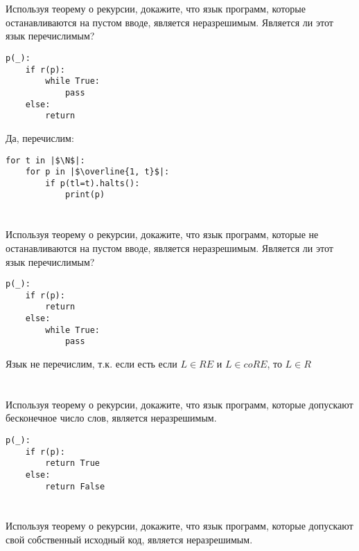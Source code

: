 



\setcounter{section}{167}

\section{}
Используя теорему о рекурсии, докажите, что язык программ, которые останавливаются на пустом вводе, является неразрешимым. Является ли этот язык перечислимым?

\begin{verbatim}
p(_):
    if r(p):
        while True:
            pass
    else:
        return
\end{verbatim}

Да, перечислим:
\begin{verbatim}
for t in |$\N$|:
    for p in |$\overline{1, t}$|:
        if p(tl=t).halts():
            print(p)
\end{verbatim}

\section{}
Используя теорему о рекурсии, докажите, что язык программ, которые не останавливаются на пустом вводе, является неразрешимым. Является ли этот язык перечислимым?

\begin{verbatim}
p(_):
    if r(p):
        return
    else:
        while True:
            pass
\end{verbatim}

Язык не перечислим, т.к. если есть если \(L \in RE\) и \(L \in coRE\), то \(L \in R\)

\section{}
Используя теорему о рекурсии, докажите, что язык программ, которые допускают бесконечное число слов, является неразрешимым.

\begin{verbatim}
p(_):
    if r(p):
        return True
    else:
        return False
\end{verbatim}

\section{}
Используя теорему о рекурсии, докажите, что язык программ, которые допускают свой собственный исходный код, является неразрешимым.


